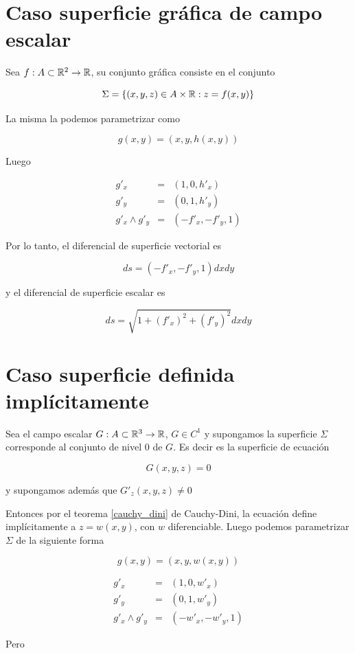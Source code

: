 \section{Caso superficie gráfica de campo escalar}

Sea $f: A \subset \mathbb{R}^2 \to \mathbb{R}$, su conjunto gráfica consiste en el conjunto 

$$ \Sigma = \{(x,y,z) \in A \times \mathbb{R} : z = f(x,y)\}$$

La misma la podemos parametrizar como 

$$ g(x,y) = (x,y, h(x,y)) $$

Luego

\begin{eqnarray*} g'_x &=& (1,0,h'_x) \\
g'_y &=& (0,1,h'_y) \\
g'_x \wedge g'_y &=& (-f'_x, -f'_y, 1) \end{eqnarray*}

Por lo tanto, el diferencial de superficie vectorial es

$$ ds = (-f'_x, -f'_y, 1)dxdy $$

y el diferencial de superficie escalar es

$$ ds = \sqrt{1 + (f'_x)^2 + (f'_y)^2 }dxdy $$

\section{Caso superficie definida implícitamente}

Sea el campo escalar $ G: A \subset \mathbb{R}^3 \to \mathbb{R}$, $ G \in C^1$ y supongamos la superficie $\Sigma$ corresponde al conjunto de nivel 0 de $G$.  Es decir es la superficie de ecuación 

$$G(x,y,z) = 0$$ 

y supongamos además que $G'_z(x,y,z) \neq 0$

Entonces por el teorema \ref{cauchy_dini} de Cauchy-Dini, la ecuación define implícitamente a $z = w(x,y)$, con $w$ diferenciable.  Luego podemos parametrizar $\Sigma$ de la siguiente forma

$$ g(x,y) = (x,y, w(x,y) )$$

\begin{eqnarray*} g'_x &=& (1,0, w'_x) \\
g'_y &=& (0,1, w'_y) \\
g'_x \wedge g'_y &=& (-w'_x, -w'_y, 1) \end{eqnarray*}

Pero

